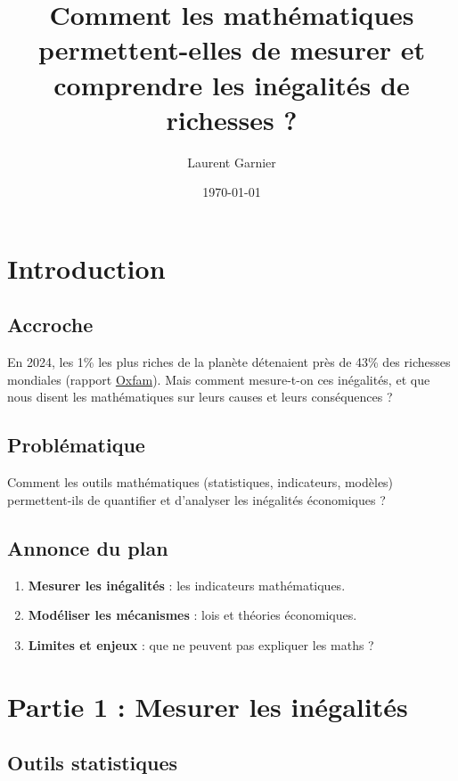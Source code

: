 \documentclass[11pt]{article}
\author{Laurent Garnier}
\date{\today}
\title{Comment les mathématiques permettent-elles de mesurer et comprendre les inégalités de richesses ?}
\begin{document}
\maketitle
\tableofcontents


\section{Introduction}
\label{sec:org119e086}
\subsection{Accroche}
\label{sec:org65e244a}

En 2024, les 1\% les plus riches de la planète détenaient près de
43\% des richesses mondiales (rapport \href{https://www.oxfamfrance.org/rapports/multinationales-et-inegalites-multiples/}{Oxfam}). Mais comment
mesure-t-on ces inégalités, et que nous disent les mathématiques
sur leurs causes et leurs conséquences ?

\subsection{Problématique}
\label{sec:org0016ef8}

Comment les outils mathématiques (statistiques, indicateurs,
modèles) permettent-ils de quantifier et d’analyser les inégalités
économiques ?

\subsection{Annonce du plan}
\label{sec:orge5e64ce}

\begin{enumerate}
\item \textbf{Mesurer les inégalités} : les indicateurs mathématiques.
\item \textbf{Modéliser les mécanismes} : lois et théories économiques.
\item \textbf{Limites et enjeux} : que ne peuvent pas expliquer les maths ?
\end{enumerate}

\section{Partie 1 : Mesurer les inégalités}
\label{sec:orgb35bae1}
\subsection{Outils statistiques}
\label{sec:orgca35b99}
\end{document}
